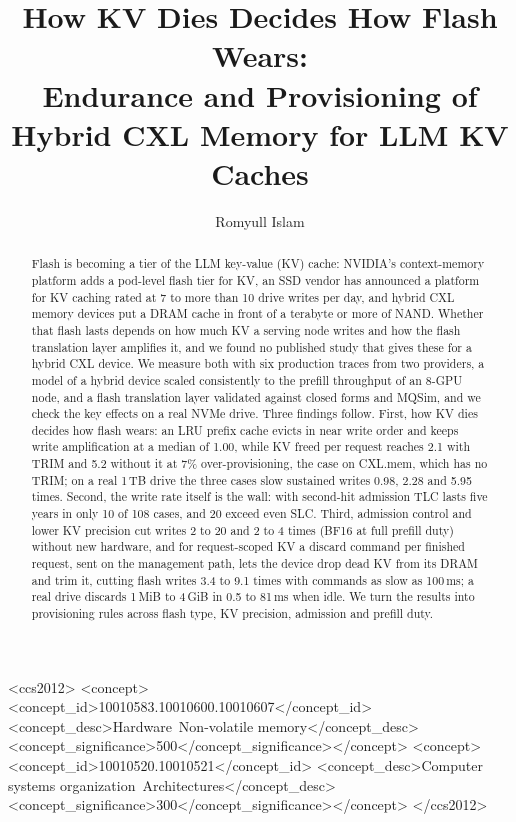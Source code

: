 \documentclass[acmsmall,screen,review]{acmart}
\begin{document}
\title{How KV Dies Decides How Flash Wears:\texorpdfstring{\\}{ }
Endurance and Provisioning of Hybrid CXL Memory for LLM KV Caches}

\author{Romyull Islam}

\begin{abstract}
Flash is becoming a tier of the LLM key-value (KV) cache: NVIDIA's context-memory platform adds a
pod-level flash tier for KV, an SSD vendor has announced a platform for KV caching rated at 7 to more
than 10 drive writes per day, and hybrid CXL memory devices put a DRAM cache in front of a terabyte
or more of NAND. Whether that flash lasts depends on how much KV a serving node writes and how the
flash translation layer amplifies it, and we found no published study that gives these for a
hybrid CXL device.
We measure both with six production traces from two providers, a model of a hybrid device scaled
consistently to the prefill throughput of an 8-GPU node, and a flash translation layer validated
against closed forms and MQSim, and we check the key effects on a real NVMe drive. Three findings follow. First, how KV dies decides how flash wears: an
LRU prefix cache evicts in near write order and keeps write amplification at a median of 1.00, while
KV freed per request reaches 2.1 with TRIM and 5.2 without it at 7\% over-provisioning, the case on
CXL.mem, which has no TRIM; on a real 1\,TB drive the three cases slow sustained writes 0.98, 2.28 and
5.95 times. Second, the write rate itself is the wall: with second-hit admission TLC
lasts five years in only 10 of 108 cases, and 20 exceed even SLC. Third, admission control and lower KV
precision cut writes 2 to 20 and 2 to 4 times (BF16 at full prefill duty) without new hardware, and for request-scoped KV a discard command per finished request,
sent on the management path, lets the device drop dead KV from its DRAM and trim it, cutting flash
writes 3.4 to 9.1 times with commands as slow as 100\,ms; a real drive discards 1\,MiB to 4\,GiB in
0.5 to 81\,ms when idle. We turn the results into provisioning rules across flash type, KV precision, admission
and prefill duty.
\end{abstract}

\begin{CCSXML}
<ccs2012>
<concept><concept_id>10010583.10010600.10010607</concept_id>
<concept_desc>Hardware~Non-volatile memory</concept_desc><concept_significance>500</concept_significance></concept>
<concept><concept_id>10010520.10010521</concept_id>
<concept_desc>Computer systems organization~Architectures</concept_desc><concept_significance>300</concept_significance></concept>
</ccs2012>
\end{CCSXML}
\end{document}
